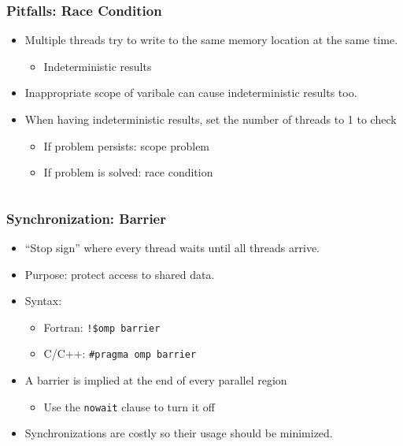 \documentclass[10pt,t]{beamer}
\begin{document}
\begin{frame}
  \frametitle{Pitfalls: Race Condition}
  \begin{itemize}
    \item Multiple threads try to write to the same memory location at the same time.
    \begin{itemize}
      \item Indeterministic results
    \end{itemize}
    \item Inappropriate scope of varibale can cause indeterministic results too.
    \item When having indeterministic results, set the number of threads to 1 to check
    \begin{itemize}
      \item If problem persists: scope problem
      \item If problem is solved: race condition
    \end{itemize}
  \end{itemize}
  \begin{columns}
    \vspace{-0.5cm}
    \begin{exampleblock}{}
      
    \end{exampleblock}
  \end{columns}
\end{frame}

\begin{frame}
  \frametitle{Synchronization: Barrier}
  \begin{itemize}
    \item ``Stop sign'' where every thread waits until all threads arrive.
    \item Purpose: protect access to shared data.
    \item Syntax:
    \begin{itemize}
      \item Fortran: \texttt{!\$omp barrier}
      \item C/C++: \texttt{\#pragma omp barrier}
    \end{itemize}
    \item A barrier is implied at the end of every parallel region
    \begin{itemize}
      \item Use the \texttt{nowait} clause to turn it off
    \end{itemize}
    \item Synchronizations are costly so their usage should be minimized.
  \end{itemize}
\end{frame}
\end{document}

